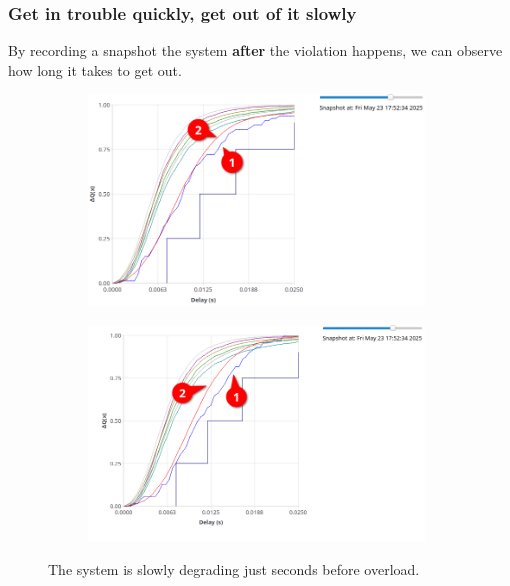         \subsubsection{Get in trouble quickly, get out of it slowly}
            By recording a snapshot the system \textbf{after} the violation happens, we can observe how long it takes to get out.
        \begin{figure}[H]
            \centering
            \begin{subfigure}{.5\textwidth}
                \centering
                \includegraphics[width=0.98\textwidth]{img/getting_bacl1.png}
                \label{fig:appr_ov_2}
            \end{subfigure}%
            \begin{subfigure}{.5\textwidth}
                \centering
                \includegraphics[width =0.98\textwidth]{img/still_bad12.png}
                \label{fig:appr_ov}
            \end{subfigure}
            \label{fig:appr_ov_t}
            \caption{The system is slowly degrading just seconds before overload.}
            \end{figure}
            
